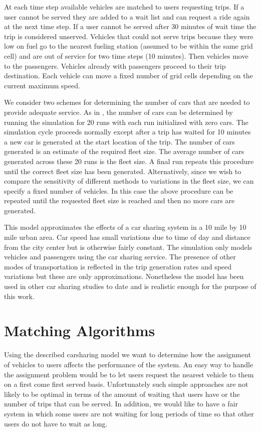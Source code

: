 \documentclass[letterpaper]{article}
\begin{document}
At each time step available vehicles are matched to users requesting trips. If a user cannot be served they are added to a wait list and can request a ride again at the next time step. If a user cannot be served after 30 minutes of wait time the trip is considered unserved. Vehicles that could not serve trips because they were low on fuel go to the nearest fueling station (assumed to be within the same grid cell) and are out of service for two time steps (10 minutes). Then vehicles move to the passengers. Vehicles already with passengers proceed to their trip destination. Each vehicle can move a fixed number of grid cells depending on the current maximum speed.

We consider two schemes for determining the number of cars that are needed to provide adequate service. As in \cite{fagnant2014travel}, the number of cars can be determined by running the simulation for 20 runs with each run initialized with zero cars. The simulation cycle proceeds normally except after a trip has waited for 10 minutes a new car is generated at the start location of the trip. The number of cars generated is an estimate of the required fleet size. The average number of cars generated across these 20 runs is the fleet size. A final run repeats this procedure until the correct fleet size has been generated. Alternatively, since we wish to compare the sensitivity of different methods to variations in the fleet size, we can specify a fixed number of vehicles. In this case the above procedure can be repeated until the requested fleet size is reached and then no more cars are generated.

This model approximates the effects of a car sharing system in a 10 mile by 10 mile urban area. Car speed has small variations due to time of day and distance from the city center but is otherwise fairly constant. The simulation only models vehicles and passengers using the car sharing service. The presence of other modes of transportation is reflected in the trip generation rates and speed variations but these are only approximations. Nonetheless the model has been used in other car sharing studies \cite{fagnant2015operations} to date and is realistic enough for the purpose of this work. 

\section{Matching Algorithms}

Using the described carsharing model we want to determine how the assignment of vehicles to users affects the performance of the system. An easy way to handle the assignment problem would be to let users request the nearest vehicle to them on a first come first served basis. Unfortunately such simple approaches are not likely to be optimal in terms of the amount of waiting that users have or the number of trips that can be served. In addition, we would like to have a fair system in which some users are not waiting for long periods of time so that other users do not have to wait as long.
\end{document}

